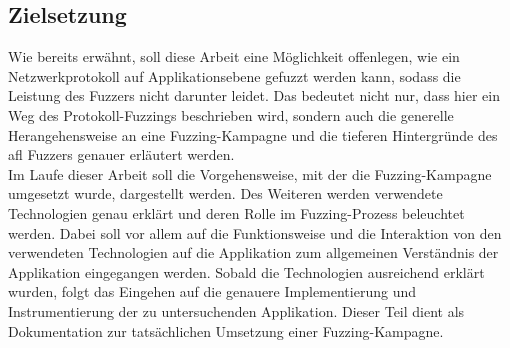 \subsection{Zielsetzung}\label{subsec:zielsetzung}
Wie bereits erwähnt, soll diese Arbeit eine Möglichkeit offenlegen, wie ein Netzwerkprotokoll auf Applikationsebene
gefuzzt werden kann, sodass die Leistung des Fuzzers nicht darunter leidet.
Das bedeutet nicht nur, dass hier ein Weg des Protokoll-Fuzzings beschrieben wird, sondern auch die generelle Herangehensweise
an eine Fuzzing-Kampagne und die tieferen Hintergründe des \gls{afl} Fuzzers genauer erläutert werden. \\
\linebreak
Im Laufe dieser Arbeit soll die Vorgehensweise, mit der die Fuzzing-Kampagne umgesetzt wurde, dargestellt werden.
Des Weiteren werden verwendete Technologien genau erklärt und deren Rolle im Fuzzing-Prozess beleuchtet werden.
Dabei soll vor allem auf die Funktionsweise und die Interaktion von den verwendeten Technologien auf die Applikation
zum allgemeinen Verständnis der Applikation eingegangen werden.
Sobald die Technologien ausreichend erklärt wurden, folgt das Eingehen auf die genauere Implementierung und Instrumentierung
der zu untersuchenden Applikation.
Dieser Teil dient als Dokumentation zur tatsächlichen Umsetzung einer Fuzzing-Kampagne.